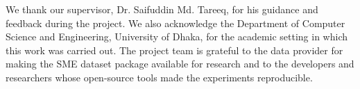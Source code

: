 We thank our supervisor, Dr. Saifuddin Md. Tareeq, for his guidance and feedback during the project. We also acknowledge the Department of Computer Science and Engineering, University of Dhaka, for the academic setting in which this work was carried out. The project team is grateful to the data provider for making the SME dataset package available for research and to the developers and researchers whose open-source tools made the experiments reproducible.